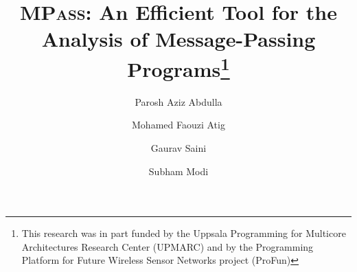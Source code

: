 \documentclass{llncs}
\newcommand{\MPass}{\textsc{MPass}}
\begin{document}
\title{\MPass:  An Efficient  Tool for the Analysis of Message-Passing Programs\thanks{This research was in part funded by the
    Uppsala Programming for Multicore Architectures Research Center
    (UPMARC)
    and by the Programming Platform for Future Wireless Sensor Networks project (ProFun)}
    }

\author{Parosh Aziz Abdulla \and Mohamed Faouzi Atig \and Gaurav Saini \and Subham Modi }

\maketitle




% 


% 





\newpage
{}
{}




\end{document}
